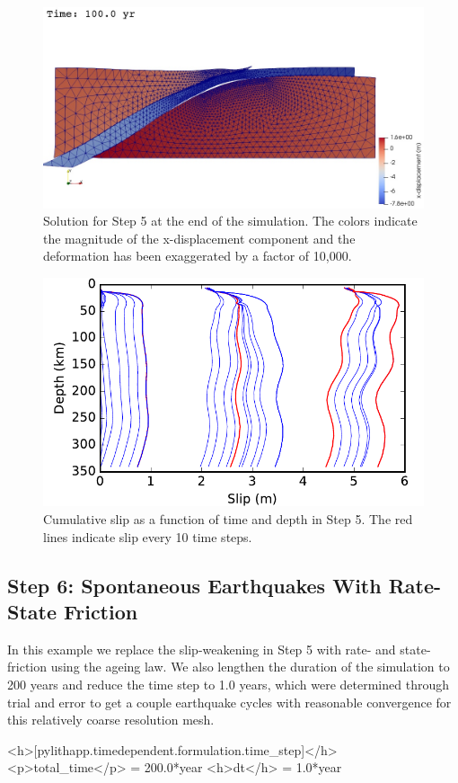\begin{figure}
  \includegraphics[width=4.5in]{examples/figs/subduction2d_step05_soln}
  \caption{Solution for Step 5 at the end of the simulation. The
    colors indicate the magnitude of the x-displacement component and
    the deformation has been exaggerated by a factor of 10,000. }
  \label{fig:example:subduction:2d:step05}
\end{figure}

\begin{figure}
  \includegraphics[width=4.5in]{examples/figs/subduction2d_step05_slip}
  \caption{Cumulative slip as a function of time and depth in Step
    5. The red lines indicate slip every 10 time steps.}
  \label{fig:example:subduction:2d:step05:slip}
\end{figure}


\subsection{Step 6: Spontaneous Earthquakes With Rate-State Friction}

In this example we replace the slip-weakening in Step 5 with rate- and
state-friction using the ageing law. We also lengthen the duration of
the simulation to 200 years and reduce the time step to 1.0 years,
which were determined through trial and error to get a couple
earthquake cycles with reasonable convergence for this relatively
coarse resolution mesh.
\begin{cfg}
<h>[pylithapp.timedependent.formulation.time_step]</h>
<p>total_time</p> = 200.0*year
<h>dt</h> = 1.0*year
\end{cfg}


